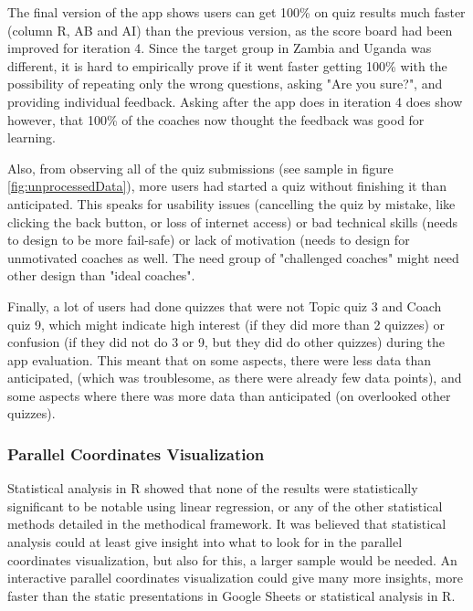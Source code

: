 The final version of the app shows users can get 100\% on quiz results much faster (column R, AB and AI) than the previous version, as the score board had been improved for iteration 4. Since the target group in Zambia and Uganda was different, it is hard to empirically prove if it went faster getting 100\% with the possibility of repeating only the wrong questions, asking "Are you sure?", and providing individual feedback. Asking after the app does in iteration 4 does show however, that 100\% of the coaches now thought the feedback was good for learning.

Also, from observing all of the quiz submissions (see sample in figure \ref{fig:unprocessedData}), more users had started a quiz without finishing it than anticipated. This speaks for usability issues (cancelling the quiz by mistake, like clicking the back button, or loss of internet access) or bad technical skills (needs to design to be more fail-safe) or lack of motivation (needs to design for unmotivated coaches as well. The need group of "challenged coaches" might need other design than "ideal coaches".

Finally, a lot of users had done quizzes that were not Topic quiz 3 and Coach quiz 9, which might indicate high interest (if they did more than 2 quizzes) or confusion (if they did not do 3 or 9, but they did do other quizzes) during the app evaluation. This meant that on some aspects, there were less data than anticipated, (which was troublesome, as there were already few data points), and some aspects where there was more data than anticipated (on overlooked other quizzes).

\subsubsection{Parallel Coordinates Visualization}
Statistical analysis in R showed that none of the results were statistically significant to be notable using linear regression, or any of the other statistical methods detailed in the methodical framework. It was believed that statistical analysis could at least give insight into what to look for in the parallel coordinates visualization, but also for this, a larger sample would be needed. An interactive parallel coordinates visualization could give many more insights, more faster than the static presentations in Google Sheets or statistical analysis in R.

